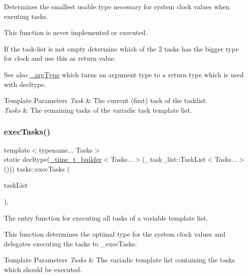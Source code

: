 Determines the smallest usable type necessary for system clock values when exeuting tasks. 

This function is never implemented or executed.

If the task-\/list is not empty determine which of the 2 tasks has the bigger type for {\ttfamily clock} and use this as return value.

\begin{DoxySeeAlso}{See also}
\hyperlink{namespacetasks_ac4a797a86584958bef0b67616a38c8ae}{\+\_\+arg\+Type} which turns an argument type to a return type which is used with decltype.
\end{DoxySeeAlso}

\begin{DoxyTemplParams}{Template Parameters}
{\em Task} & The current (first) task of the tasklist. \\
\hline
{\em Tasks} & The remaining tasks of the variadic task template list. \\
\hline
\end{DoxyTemplParams}
\hypertarget{namespacetasks_a6590d6a524b4aedb5d0dfef5e1b61bc1}{}\label{namespacetasks_a6590d6a524b4aedb5d0dfef5e1b61bc1} 
\subsubsection{\texorpdfstring{exec\+Tasks()}{execTasks()}}
{\footnotesize\ttfamily template$<$typename... Tasks$>$ \\
static decltype(\hyperlink{namespacetasks_a9469b8fb917e0f3ec0168293ac046a4c}{\+\_\+time\+\_\+t\+\_\+builder}$<$Tasks...$>$(\+\_\+task\+\_\+list\+::\+Task\+List$<$Tasks...$>$())) tasks\+::exec\+Tasks (\begin{DoxyParamCaption}\item[{const \+\_\+task\+\_\+list\+::\+Task\+List$<$ Tasks... $>$ \&}]{task\+List }\end{DoxyParamCaption})\hspace{0.3cm}{\ttfamily [inline]}, {\ttfamily [static]}}



The entry function for executing all tasks of a variable template list. 

This function determines the optimal type for the system clock values and delegates executing the tasks to \+\_\+exec\+Tasks.


\begin{DoxyTemplParams}{Template Parameters}
{\em Tasks} & The variadic template list containing the tasks which should be executed. \\
\hline
\end{DoxyTemplParams}
